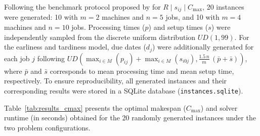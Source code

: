 \documentclass{article}
\begin{document}
Following the benchmark protocol proposed by \cite{eva2011} for $R \mid s_{ij} \mid C_{\max}$, 20 instances were generated: 10 with $m=2$ machines and $n=5$ jobs, and 10 with $m=4$ machines and $n=10$ jobs. Processing times ($p$) and setup times ($s$) were independently sampled from the discrete uniform distribution $UD(1,99)$. 
For the earliness and tardiness model, due dates ($d_j$) were additionally generated for each job $j$ following $UD\left(\max_{i \in M}(p_{ij}) + \max_{i \in M}(s_{i0j}), \frac{1.5 \, n}{m} \, (\bar{p} + \bar{s})\right)$, where $\bar{p}$ and $\bar{s}$ corresponds to mean processing time and mean setup time, respectively. 
To ensure reproducibility, all generated instances and their corresponding results were stored in a SQLite database (\texttt{instances.sqlite}).

Table~\ref{tab:results_cmax} presents the optimal makespan ($C_{\max}$) and solver runtime (in seconds) obtained for the 20 randomly generated instances under the two problem configurations.
\end{document}
